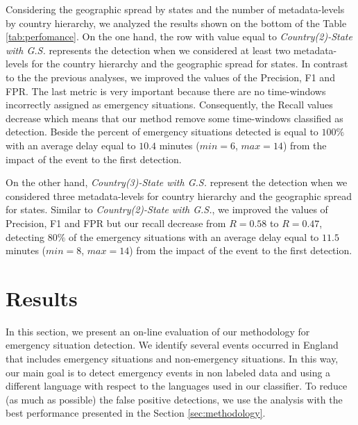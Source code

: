 \documentclass[sigconf]{acmart}
\begin{document}
Considering the geographic spread by states and the number of metadata-levels by country hierarchy, we analyzed the results shown on the bottom of the Table \ref{tab:perfomance}. On the one hand, the row with value equal to \textit{Country(2)-State with G.S.} represents the detection when we considered at least two metadata-levels for the country hierarchy and the geographic spread for states. In contrast to the the previous analyses, we improved the values of the Precision, F1 and FPR. The last metric is very important because there are no time-windows incorrectly assigned as emergency situations. Consequently, the Recall values decrease which means that our method remove some time-windows classified as detection. Beside the percent of emergency situations detected is equal to $100\%$ with an average delay equal to $10.4$ minutes ($min=6$, $max=14$) from the impact of the event to the first detection.


On the other hand, \textit{Country(3)-State with G.S.} represent the detection when we considered three metadata-levels for country hierarchy and the geographic spread for states. Similar to  \textit{Country(2)-State with G.S.}, we improved the values of Precision, F1 and FPR but our recall decrease from $R = 0.58$ to $R = 0.47$, detecting  $80\%$ of the emergency situations with an average delay equal to $11.5$ minutes ($min=8$, $max=14$) from the impact of the event to the first detection.


\section{Results}

In this section, we present an on-line evaluation of our methodology for emergency situation detection. We identify several events occurred in England that includes emergency situations and non-emergency situations. In this way, our main goal is to detect emergency events in non labeled data and using a different language with respect to the languages used in our classifier. To reduce (as much as possible) the false positive detections, we use the analysis with the best performance presented in the Section \ref{sec:methodology}.



\end{document}
